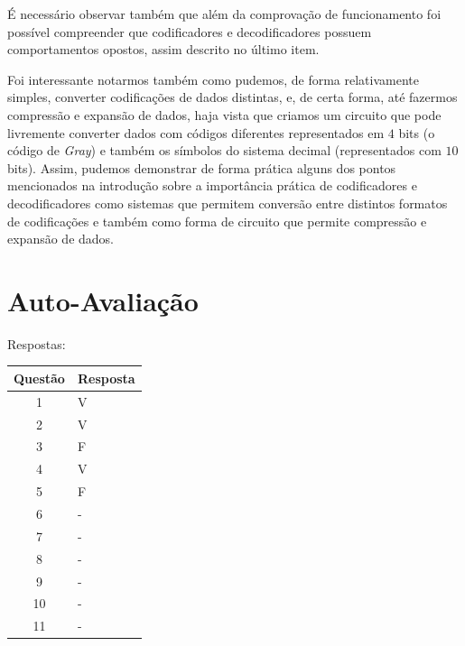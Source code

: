 \documentclass[12pt]{article}
\begin{document}
É necessário observar também que além da comprovação de funcionamento foi
possível compreender que codificadores e decodificadores possuem comportamentos
opostos, assim descrito no último item.

Foi interessante notarmos também como pudemos, de forma relativamente simples,
converter codificações de dados distintas, e, de certa forma, até fazermos
compressão e expansão de dados, haja vista que criamos um circuito que pode
livremente converter dados com códigos diferentes representados em $4$ bits (o
código de \emph{Gray}) e também os símbolos do sistema decimal (representados
com $10$ bits). Assim, pudemos demonstrar de forma prática alguns dos pontos
mencionados na introdução sobre a importância prática de codificadores e
decodificadores como sistemas que permitem conversão entre distintos formatos de
codificações e também como forma de circuito que permite compressão e expansão
de dados.


\nocite{*}



\newpage
\section*{Auto-Avaliação}

Respostas:

\begin{table}[H]
      \begin{tabular}{|c|l|} \hline
      \textbf{Questão} & \textbf{Resposta}\\
      \hline
      1  & V \\ \hline
      2  & V \\ \hline
      3  & F \\ \hline
      4  & V \\ \hline
      5  & F \\ \hline
      6  & - \\ \hline
      7  & - \\ \hline
      8  & - \\ \hline
      9  & - \\ \hline
      10 & - \\ \hline
      11 & - \\ \hline
      \end{tabular}
\end{table}
\end{document}
